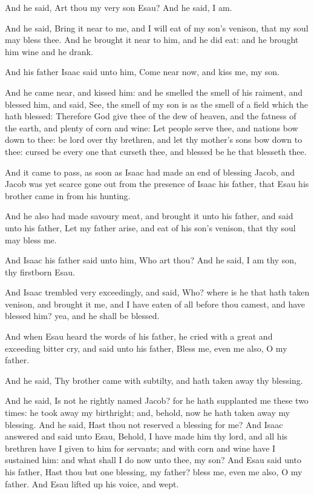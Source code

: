 \verse And he said, Art thou my very son Esau? And he said, I am.

\verse And he said, Bring it near to me, and I will eat of my son's venison, that my soul may bless thee. And he brought it near to him, and he did eat: and he brought him wine and he drank.

\verse And his father Isaac said unto him, Come near now, and kiss me, my son.

\verse And he came near, and kissed him: and he smelled the smell of his raiment, and blessed him, and said, See, the smell of my son is as the smell of a field which the \LORD hath blessed: \verse Therefore God give thee of the dew of heaven, and the fatness of the earth, and plenty of corn and wine: \verse Let people serve thee, and nations bow down to thee: be lord over thy brethren, and let thy mother's sons bow down to thee: cursed be every one that curseth thee, and blessed be he that blesseth thee.

\verse And it came to pass, as soon as Isaac had made an end of blessing Jacob, and Jacob was yet scarce gone out from the presence of Isaac his father, that Esau his brother came in from his hunting.

\verse And he also had made savoury meat, and brought it unto his father, and said unto his father, Let my father arise, and eat of his son's venison, that thy soul may bless me.

\verse And Isaac his father said unto him, Who art thou? And he said, I am thy son, thy firstborn Esau.

\verse And Isaac trembled very exceedingly, and said, Who? where is he that hath taken venison, and brought it me, and I have eaten of all before thou camest, and have blessed him? yea, and he shall be blessed.

\verse And when Esau heard the words of his father, he cried with a great and exceeding bitter cry, and said unto his father, Bless me, even me also, O my father.

\verse And he said, Thy brother came with subtilty, and hath taken away thy blessing.

\verse And he said, Is not he rightly named Jacob? for he hath supplanted me these two times: he took away my birthright; and, behold, now he hath taken away my blessing. And he said, Hast thou not reserved a blessing for me?  \verse And Isaac answered and said unto Esau, Behold, I have made him thy lord, and all his brethren have I given to him for servants; and with corn and wine have I sustained him: and what shall I do now unto thee, my son?  \verse And Esau said unto his father, Hast thou but one blessing, my father? bless me, even me also, O my father. And Esau lifted up his voice, and wept.

